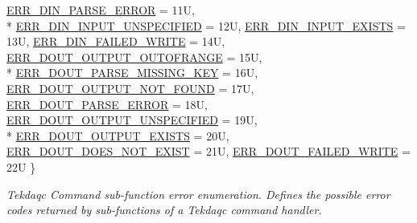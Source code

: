 \begin{DoxyCompactItemize}
\hyperlink{group__tekdaqc__error_gga19df05d919ecca7a7501b35ae9080a32a1fdba18aeb40222a8093ba5c21743d63}{E\-R\-R\-\_\-\-D\-I\-N\-\_\-\-P\-A\-R\-S\-E\-\_\-\-E\-R\-R\-O\-R} = 11\-U, 
\\*
\hyperlink{group__tekdaqc__error_gga19df05d919ecca7a7501b35ae9080a32a6afc0a4e8d5edddc35cf7e832a5cd34c}{E\-R\-R\-\_\-\-D\-I\-N\-\_\-\-I\-N\-P\-U\-T\-\_\-\-U\-N\-S\-P\-E\-C\-I\-F\-I\-E\-D} = 12\-U, 
\hyperlink{group__tekdaqc__error_gga19df05d919ecca7a7501b35ae9080a32a1c9687d4dcb05658e98cc42bca1f772c}{E\-R\-R\-\_\-\-D\-I\-N\-\_\-\-I\-N\-P\-U\-T\-\_\-\-E\-X\-I\-S\-T\-S} = 13\-U, 
\hyperlink{group__tekdaqc__error_gga19df05d919ecca7a7501b35ae9080a32a175be727dd04686ceea0b6dea920c086}{E\-R\-R\-\_\-\-D\-I\-N\-\_\-\-F\-A\-I\-L\-E\-D\-\_\-\-W\-R\-I\-T\-E} = 14\-U, 
\hyperlink{group__tekdaqc__error_gga19df05d919ecca7a7501b35ae9080a32a8758a8b600c1e97bf2120d7b094853d6}{E\-R\-R\-\_\-\-D\-O\-U\-T\-\_\-\-O\-U\-T\-P\-U\-T\-\_\-\-O\-U\-T\-O\-F\-R\-A\-N\-G\-E} = 15\-U, 
\\*
\hyperlink{group__tekdaqc__error_gga19df05d919ecca7a7501b35ae9080a32ace6d9a0db21ee0e4c19401983885ceb5}{E\-R\-R\-\_\-\-D\-O\-U\-T\-\_\-\-P\-A\-R\-S\-E\-\_\-\-M\-I\-S\-S\-I\-N\-G\-\_\-\-K\-E\-Y} = 16\-U, 
\hyperlink{group__tekdaqc__error_gga19df05d919ecca7a7501b35ae9080a32a479b09599d4e42281405cbe309eb3205}{E\-R\-R\-\_\-\-D\-O\-U\-T\-\_\-\-O\-U\-T\-P\-U\-T\-\_\-\-N\-O\-T\-\_\-\-F\-O\-U\-N\-D} = 17\-U, 
\hyperlink{group__tekdaqc__error_gga19df05d919ecca7a7501b35ae9080a32afb0f8766c1df8e8a426d924bcfc4f307}{E\-R\-R\-\_\-\-D\-O\-U\-T\-\_\-\-P\-A\-R\-S\-E\-\_\-\-E\-R\-R\-O\-R} = 18\-U, 
\hyperlink{group__tekdaqc__error_gga19df05d919ecca7a7501b35ae9080a32ad9259c255c285f14160be2c818aba367}{E\-R\-R\-\_\-\-D\-O\-U\-T\-\_\-\-O\-U\-T\-P\-U\-T\-\_\-\-U\-N\-S\-P\-E\-C\-I\-F\-I\-E\-D} = 19\-U, 
\\*
\hyperlink{group__tekdaqc__error_gga19df05d919ecca7a7501b35ae9080a32a520fcf3c938ea91074fa15aa6802bda2}{E\-R\-R\-\_\-\-D\-O\-U\-T\-\_\-\-O\-U\-T\-P\-U\-T\-\_\-\-E\-X\-I\-S\-T\-S} = 20\-U, 
\hyperlink{group__tekdaqc__error_gga19df05d919ecca7a7501b35ae9080a32ab7463197737e0940ba45390cf1a51083}{E\-R\-R\-\_\-\-D\-O\-U\-T\-\_\-\-D\-O\-E\-S\-\_\-\-N\-O\-T\-\_\-\-E\-X\-I\-S\-T} = 21\-U, 
\hyperlink{group__tekdaqc__error_gga19df05d919ecca7a7501b35ae9080a32a647717acbbc83fc85a04b32e58a9c92a}{E\-R\-R\-\_\-\-D\-O\-U\-T\-\_\-\-F\-A\-I\-L\-E\-D\-\_\-\-W\-R\-I\-T\-E} = 22\-U
 \}
\begin{DoxyCompactList}\small\item\em Tekdaqc Command sub-\/function error enumeration. Defines the possible error codes returned by sub-\/functions of a Tekdaqc command handler. \end{DoxyCompactList}\end{DoxyCompactItemize}
